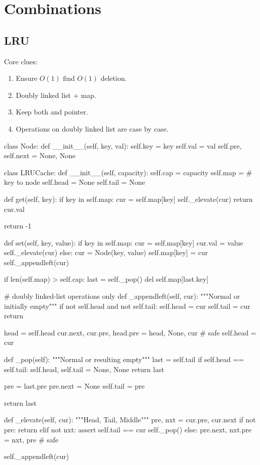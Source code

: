 \section{Combinations}
\subsection{LRU}
Core clues:
\begin{enumerate}
\item Ensure $O(1)$ find $O(1)$ deletion. 
\item Doubly linked list + map.
\item Keep both  and  pointer.
\item Operations on doubly linked list are case by case.  
\end{enumerate}
\begin{python}
class Node:
    def __init__(self, key, val):
        self.key = key
        self.val = val
        self.pre, self.next = None, None


class LRUCache:
    def __init__(self, capacity):
        self.cap = capacity
        self.map = {}  # key to node
        self.head = None
        self.tail = None

    def get(self, key):
        if key in self.map:
            cur = self.map[key]
            self._elevate(cur)
            return cur.val

        return -1

    def set(self, key, value):
        if key in self.map:
            cur = self.map[key]
            cur.val = value
            self._elevate(cur)
        else:
            cur = Node(key, value)
            self.map[key] = cur
            self._appendleft(cur)

            if len(self.map) > self.cap:
                last = self._pop()
                del self.map[last.key]

    # doubly linked-list operations only
    def _appendleft(self, cur):
        """Normal or initially empty"""
        if not self.head and not self.tail:
            self.head = cur
            self.tail = cur
            return

        head = self.head
        cur.next, cur.pre, head.pre = head, None, cur  # safe
        self.head = cur

    def _pop(self):
        """Normal or resulting empty"""
        last = self.tail
        if self.head == self.tail:
            self.head, self.tail = None, None
            return last

        pre = last.pre
        pre.next = None
        self.tail = pre
        
        return last

    def _elevate(self, cur):
        """Head, Tail, Middle"""
        pre, nxt = cur.pre, cur.next
        if not pre:
            return
        elif not nxt:
            assert self.tail == cur
            self._pop()
        else:
            pre.next, nxt.pre = nxt, pre  # safe

        self._appendleft(cur)
\end{python}
